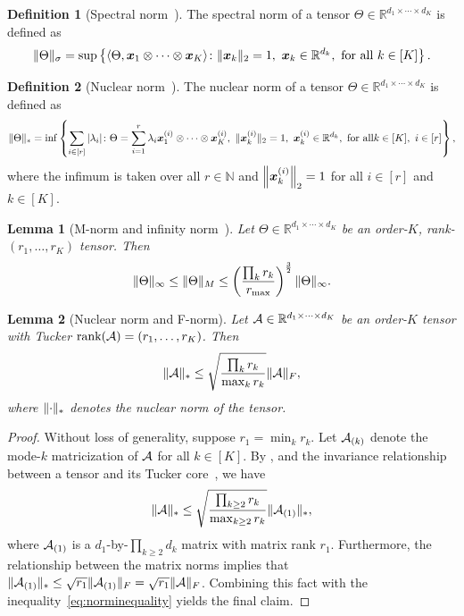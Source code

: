 \documentclass[11pt]{article}
\theoremstyle{plain}
\newtheorem{lem}{Lemma}
\theoremstyle{definition}
\newtheorem{defn}{Definition}
\begin{document}
\begin{defn}[Spectral norm~\citep{lim2005singular}]
The spectral norm of a tensor $\Theta\in\mathbb{R}^{d_1\times \cdots \times d_K}$ is defined as
\[
\snormSize{}{\Theta}=\sup\left\{\langle \Theta, \mx_1\otimes \cdots \otimes \mx_K\rangle \colon \vnormSize{}{\mx_k}=1,\ \mx_k\in\mathbb{R}^{d_k},\ \text{for all}\ k\in[K]\right\}.
\]
\end{defn}

\begin{defn}[Nuclear norm~\citep{friedland2018nuclear}]
The nuclear norm of a tensor $\Theta\in\mathbb{R}^{d_1\times \cdots \times d_K}$ is defined as
\[
\nnormSize{}{\Theta}=\inf
\left\{
\sum_{i\in[r]}|\lambda_i|\colon \Theta=\sum_{i=1}^r \lambda_i\mx^{(i)}_1\otimes \cdots \otimes \mx^{(i)}_K,\ \vnormSize{}{\mx^{(i)}_k}=1,\ \mx^{(i)}_k\in\mathbb{R}^{d_k},\ \text{for all} k\in[K],\ i\in[r]
\right\},
\]
where the infimum is taken over all $r\in\mathbb{N}$ and $\left\lVert\bm x^{(i)}_k\right\rVert_2=1$ for all $i\in[r]$ and $k\in[K]$.
\end{defn}



\begin{lem}[M-norm and infinity norm~\citep{ghadermarzy2019near}]\label{lem:Mnormbound}
Let $\Theta\in\mathbb{R}^{d_1\times \cdots \times d_K}$ be an order-$K$, rank-$(r_1,\ldots,r_K)$ tensor. Then
\[
\lVert\Theta\rVert_\infty\leq \lVert\Theta\rVert_M\leq \left(\prod_k r_k \over r_{\max}\right)^{3\over 2} \lVert\Theta\rVert_\infty.
\]
\end{lem}


\begin{lem}[Nuclear norm and F-norm] \label{lem:nuclear}
Let $\mathcal{A}\in\mathbb{R}^{d_1\times\cdots\times d_K}$ be an order-$K$ tensor with Tucker $\text{rank}(\mathcal{A})=(r_1,\ldots,r_K)$. Then
\[
\lVert\mathcal{A}\rVert_* \leq \sqrt{\prod_k r_k\over \max_k r_k} \lVert\mathcal{A}\rVert_F,
\]
where $\lVert\cdot\rVert_*$ denotes the nuclear norm of the tensor.
\end{lem}

\begin{proof}
Without loss of generality, suppose $r_1=\min_k r_k$. Let $\mathcal{A}_{(k)}$ denote the mode-$k$ matricization of $\mathcal{A}$ for all $k\in[K]$. By \citet[Corollary 4.11]{wang2017operator}, and the invariance relationship between a tensor and its Tucker core~\citep[Section 6]{jiang2017tensor}, we have
\begin{equation}\label{eq:norminequality}
\lVert\mathcal{A}\rVert_* \leq \sqrt{\prod_{k\geq 2} r_k \over \max_{k\geq 2} r_k} \lVert\mathcal{A}_{(1)}\rVert_*,
\end{equation}
where $\mathcal{A}_{(1)}$ is a $d_1$-by-$\prod_{k\geq 2}d_k$ matrix with matrix rank $r_1$. Furthermore, the relationship between the matrix norms implies that $\lVert\mathcal{A}_{(1)}\rVert_*\leq \sqrt{r_1}\lVert\mathcal{A}_{(1)}\rVert_F=\sqrt{r_1}\lVert\mathcal{A}\rVert_F$. Combining this fact with the inequality~\eqref{eq:norminequality} yields the final claim.
\end{proof}
\end{document}
